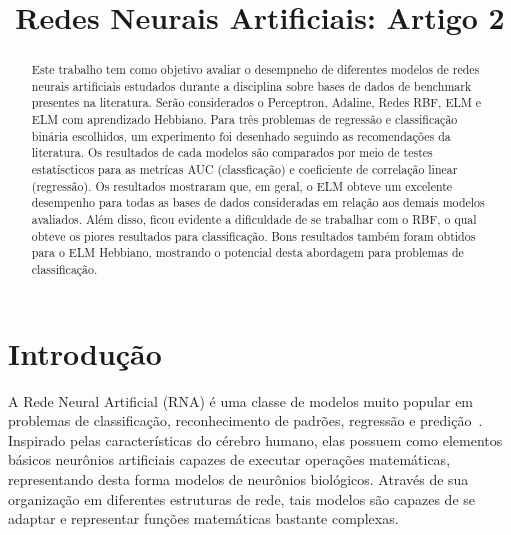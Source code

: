 \documentclass[conference]{IEEEtran}
\begin{document}
	
	\title{Redes Neurais Artificiais: Artigo 2}
	
	
	\author{
		}
	
	
	
	\maketitle
	
	\begin{abstract}
		Este trabalho tem como objetivo avaliar o desempneho de diferentes modelos de redes neurais artificiais estudados durante a disciplina sobre bases de dados de benchmark presentes na literatura. Serão considerados o Perceptron, Adaline, Redes RBF, ELM e ELM com aprendizado Hebbiano. Para três problemas de regressão e classificação binária escolhidos, um experimento foi desenhado seguindo as recomendações da literatura. Os resultados de cada modelos são comparados por meio de testes estatíscticos para as metrícas AUC (classficação) e coeficiente de correlação linear (regressão). Os resultados mostraram que, em geral, o ELM obteve um excelente desempenho para todas as bases de dados consideradas em relação aos demais modelos avaliados. Além disso, ficou evidente a dificuldade de se trabalhar com o RBF, o qual obteve os piores resultados para classificação. Bons resultados também foram obtidos para o ELM Hebbiano, mostrando o potencial desta abordagem para problemas de classificação.
	\end{abstract}

	\section{Introdução}
	A Rede Neural Artificial (RNA) é uma classe de modelos muito popular em problemas de classificação, reconhecimento de padrões, regressão e predição~\cite{jain1996artificial}. Inspirado pelas características do cérebro humano, elas possuem como elementos básicos neurônios artificiais capazes de executar operações matemáticas, representando desta forma modelos de neurônios biológicos. Através de sua organização em diferentes estruturas de rede, tais modelos são capazes de se adaptar e representar funções matemáticas bastante complexas. 
	
\end{document}
